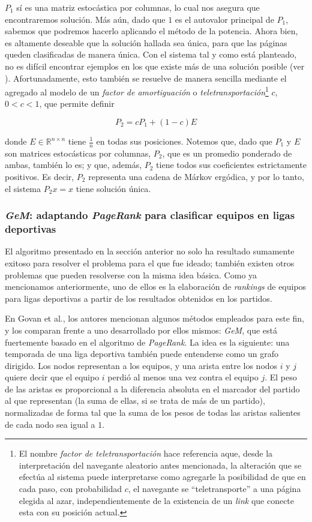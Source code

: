         $P_1$ sí es una matriz estocástica por columnas, lo cual nos asegura que encontraremos solución. Más aún, dado que $1$ es el autovalor principal de $P_1$, sabemos que podremos hacerlo aplicando el método de la potencia. Ahora bien, es altamente deseable que la solución hallada sea única, para que las páginas queden clasificadas de manera única. Con el sistema tal y como está planteado, no es difícil encontrar ejemplos en los que existe más de una solución posible (ver \cite{Bryan2006}). Afortunadamente, esto también se resuelve de manera sencilla mediante el agregado al modelo de un \emph{factor de amortiguación} o \emph{teletransportación}\footnote{El nombre \emph{factor de teletransportación} hace referencia aque, desde la interpretación del navegante aleatorio antes mencionada, la alteración que se efectúa al sistema puede interpretarse como agregarle la posibilidad de que en cada paso, con probabilidad $c$, el navegante se ``teletransporte'' a una página elegida al azar, independientemente de la existencia de un \emph{link} que conecte esta con su posición actual.} $c$, $0 < c < 1$, que permite definir

        \[ P_2 = c P_1 + (1 - c) E \]

        \noindent donde $E \in \mathbb{R}^{n \times n}$ tiene $\frac{1}{n}$ en todas sus posiciones. Notemos que, dado que $P_1$ y $E$ son matrices estocásticas por columnas, $P_2$, que es un promedio ponderado de ambas, también lo es; y que, además, $P_2$ tiene todos sus coeficientes estrictamente positivos. Es decir, $P_2$ representa una cadena de Márkov ergódica, y por lo tanto, el sistema $P_2 x = x$ tiene solución única.

        \subsubsection{\emph{GeM}: adaptando \emph{PageRank} para clasificar equipos en ligas deportivas}

        El algoritmo presentado en la sección anterior no solo ha resultado sumamente exitoso para resolver el problema para el que fue ideado; también existen otros problemas que pueden resolverse con la misma idea básica. Como ya mencionamos anteriormente, uno de ellos es la elaboración de \emph{rankings} de equipos para ligas deportivas a partir de los resultados obtenidos en los partidos.

        En Govan et al.\cite{Govan2008}, los autores mencionan algunos métodos empleados para este fin, y los comparan frente a uno desarrollado por ellos mismos: \emph{GeM}, que está fuertemente basado en el algoritmo de \emph{PageRank}. La idea es la siguiente: una temporada de una liga deportiva también puede entenderse como un grafo dirigido. Los nodos representan a los equipos, y una arista entre los nodos $i$ y $j$ quiere decir que el equipo $i$ perdió al menos una vez contra el equipo $j$. El peso de las aristas es proporcional a la diferencia absoluta en el marcador del partido al que representan (la suma de ellas, si se trata de más de un partido), normalizadas de forma tal que la suma de los pesos de todas las aristas salientes de cada nodo sea igual a $1$.

